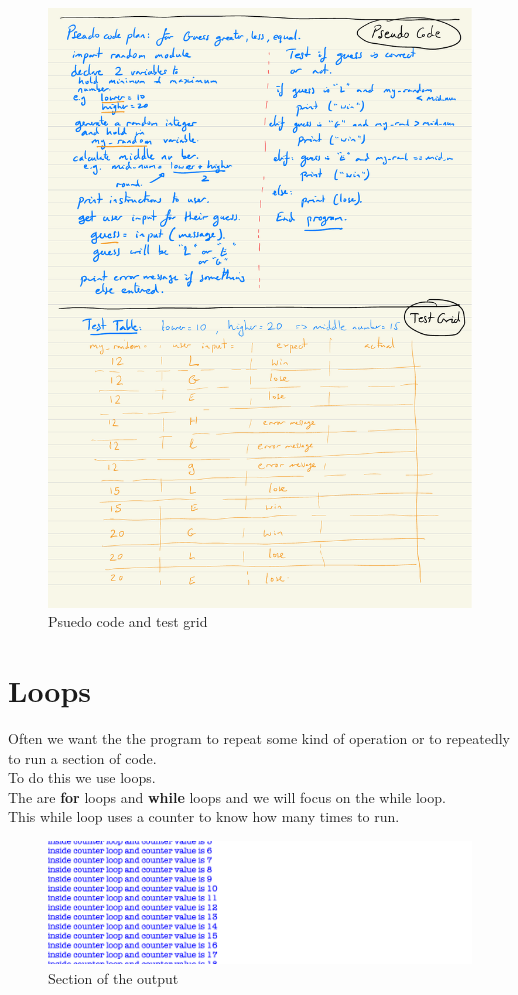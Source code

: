 \documentclass[a4paper,12pt]{article}
\begin{document}
\begin{figure} [!h]
	\centering
	\includegraphics[width=17cm]{iterative_processes/Greater_Less_Equal_planning.pdf}
	\caption*{Psuedo code and test grid}
\end{figure}

\newpage
\section{Loops}
Often we want the the program to repeat some kind of operation or to repeatedly to run a section of code.\\
To do this we use loops.\\
The are \textbf{for} loops and \textbf{while} loops and we will focus on the while loop.\\

This while loop uses a counter to know how many times to run.

 \begin{figure} [!h]
	\centering
	\includegraphics[width=17cm]{screen_shots/loop_counter.png}
	\caption*{Section of the output}
\end{figure}
\end{document}
